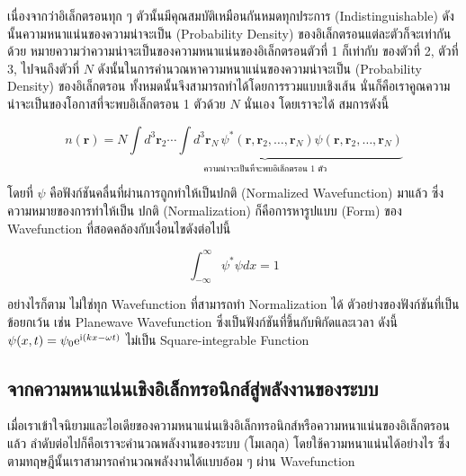 เนื่องจากว่าอิเล็กตรอนทุก ๆ ตัวนั้นมีคุณสมบัติเหมือนกันหมดทุกประการ (Indistinguishable) ดังนั้นความหนาแน่นของความน่าจะเป็น
(Probability Density) ของอิเล็กตรอนแต่ละตัวก็จะเท่ากันด้วย หมายความว่าความน่าจะเป็นของความหนาแน่นของอิเล็กตรอนตัวที่ 1 ก็เท่ากับ%
ของตัวที่ 2, ตัวที่ 3, ไปจนถึงตัวที่ $N$ ดังนั้นในการคำนวณหาความหนาแน่นของความน่าจะเป็น (Probability Density) ของอิเล็กตรอน%
ทั้งหมดนั้นจึงสามารถทำได้โดยการรวมแบบเชิงเส้น นั่นก็คือเราคูณความน่าจะเป็นของโอกาสที่จะพบอิเล็กตรอน 1 ตัวด้วย $N$ นั่นเอง โดยเราจะได้%
สมการดังนี้

\begin{equation}\label{eq:elec_density_all}
    n(\bm{r}) = N \underbrace{\int {d}^{3} \bm{r}_{2} \cdots \int {d}^{3} \bm{r}_{N} \,
        \psi^*(\bm{r}, \bm{r}_{2}, \dots, \bm{r}_{N}) \psi(\bm{r}, \bm{r}_2,
        \dots, \bm{r}_N)}_{\textstyle \text{ความน่าจะเป็นที่จะพบอิเล็กตรอน 1 ตัว}}
\end{equation}

\noindent โดยที่ $\psi$ คือฟังก์ชันคลื่นที่ผ่านการถูกทำให้เป็นปกติ (Normalized Wavefunction) มาแล้ว ซึ่งความหมายของการทำให้เป็น%
ปกติ (Normalization) ก็คือการหารูปแบบ (Form) ของ Wavefunction ที่สอดคล้องกับเงื่อนไขดังต่อไปนี้

\begin{equation}\label{eq:square_integrable}
    \int^\infty_{-\infty} \psi^* \psi dx = 1
\end{equation}

อย่างไรก็ตาม ไม่ใช่ทุก Wavefunction ที่สามารถทำ Normalization ได้ ตัวอย่างของฟังก์ชันที่เป็นข้อยกเว้น เช่น Planewave Wavefunction
ซึ่งเป็นฟังก์ชันที่ขึ้นกับพิกัดและเวลา ดังนี้ $\psi(x,t) = \psi_0 {\rm e}^{ {\rm i} (k x-\omega t)}$ ไม่เป็น Square-integrable
Function

\subsection{จากความหนาแน่นเชิงอิเล็กทรอนิกส์สู่พลังงานของระบบ}
\label{ssec:ener_density}

เมื่อเราเข้าใจนิยามและไอเดียของความหนาแน่นเชิงอิเล็กทรอนิกส์หรือความหนาแน่นของอิเล็กตรอนแล้ว ลำดับต่อไปก็คือเราจะคำนวณพลังงานของระบบ
(โมเลกุล) โดยใช้ความหนาแน่นได้อย่างไร ซึ่งตามทฤษฎีนั้นเราสามารถคำนวณพลังงานได้แบบอ้อม ๆ ผ่าน Wavefunction


